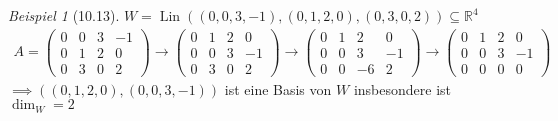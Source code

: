 \documentclass[a4paper]{scrartcl}
\DeclareMathOperator{\Lin}{Lin}
\theoremstyle{definition}
\theoremstyle{plain}
\theoremstyle{plain}
\theoremstyle{remark}
\theoremstyle{remark}
\theoremstyle{remark}
\theoremstyle{remark}
\theoremstyle{remark}
\newtheorem{ex}{Beispiel}
\begin{document}
\begin{ex}[10.13]
$W = \Lin((0,0,3,-1), (0, 1, 2, 0), (0, 3, 0, 2)) \subseteq \mathbb{R}^4$
\begin{gather}
A = \begin{pmatrix}
0 & 0 & 3 & -1 \\
0 & 1 & 2 & 0 \\
0 & 3 & 0 & 2
\end{pmatrix}
\to
\begin{pmatrix}
0 & 1 & 2 & 0 \\
0 & 0 & 3 & -1 \\
0 & 3 & 0 & 2
\end{pmatrix}
\to
\begin{pmatrix}
0 & 1 & 2 & 0 \\
0 & 0 & 3 & -1 \\
0 & 0 & -6 & 2
\end{pmatrix}
\to
\begin{pmatrix}
0 & 1 & 2 & 0 \\
0 & 0 & 3 & -1 \\
0 & 0 & 0 & 0
\end{pmatrix}
\end{gather}
$\implies ((0,1,2,0), (0,0,3,-1))$ ist eine Basis von $W$ insbesondere ist $\dim_W = 2$
\end{ex}
\end{document}
